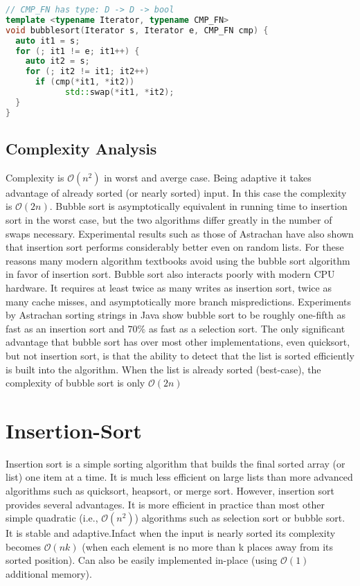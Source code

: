 \begin{lstlisting}[language=C++, caption="Bubble-sort implementation in C++14"]
// CMP_FN has type: D -> D -> bool
template <typename Iterator, typename CMP_FN>
void bubblesort(Iterator s, Iterator e, CMP_FN cmp) {
  auto it1 = s;
  for (; it1 != e; it1++) {
    auto it2 = s;
    for (; it2 != it1; it2++)
      if (cmp(*it1, *it2)) 
      		std::swap(*it1, *it2);
  }
}
\end{lstlisting}

\subsection{Complexity Analysis}
Complexity is $\mathcal{O}(n^2)$ in worst and averge case. Being adaptive it takes advantage of already sorted (or nearly sorted) input. In this case the complexity is $\mathcal{O}(2n)$.
Bubble sort is asymptotically equivalent in running time to insertion sort in the worst case, but the two algorithms differ greatly in the number of swaps necessary. Experimental results such as those of Astrachan have also shown that insertion sort performs considerably better even on random lists. For these reasons many modern algorithm textbooks avoid using the bubble sort algorithm in favor of insertion sort.
Bubble sort also interacts poorly with modern CPU hardware. It requires at least twice as many writes as insertion sort, twice as many cache misses, and asymptotically more branch mispredictions. Experiments by Astrachan sorting strings in Java show bubble sort to be roughly one-fifth as fast as an insertion sort and $70\%$ as fast as a selection sort.
The only significant advantage that bubble sort has over most other implementations, even quicksort, but not insertion sort, is that the ability to detect that the list is sorted efficiently is built into the algorithm. When the list is already sorted (best-case), the complexity of bubble sort is only $\mathcal{O}(2n)$

\section{Insertion-Sort}
\label{sec:insertionsort}
Insertion sort is a simple sorting algorithm that builds the final sorted array (or list) one item at a time. It is much less efficient on large lists than more advanced algorithms such as quicksort, heapsort, or merge sort. However, insertion sort provides several advantages.
It is more efficient in practice than most other simple quadratic (i.e., $\mathcal{O}(n^2)$) algorithms such as selection sort or bubble sort. It is stable and adaptive.Infact when the input is nearly sorted its complexity becomes $\mathcal{O}(nk)$ (when each element is no more than k places away from its sorted position). Can also be easily implemented in-place (using $\mathcal{O}(1)$ additional memory).

